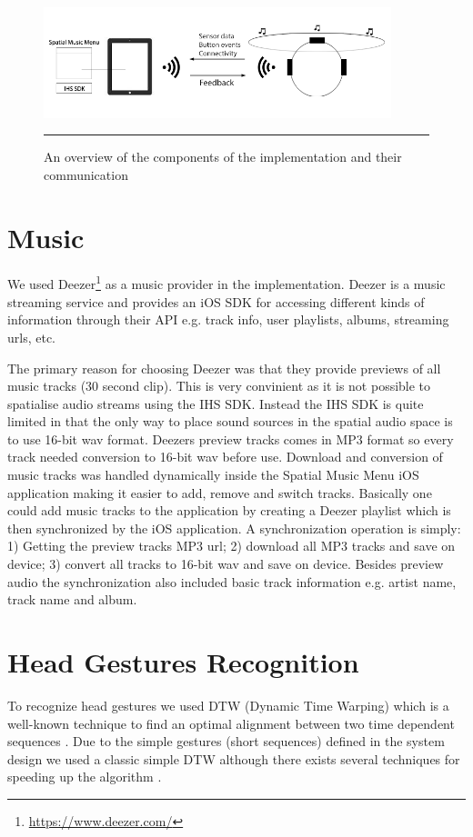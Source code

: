 \begin{figure}[t]
	\centering
		\includegraphics[width=0.9\textwidth,height=\textheight,keepaspectratio]{./Figures/implementation_overview.png}
		\rule{35em}{1pt}
	\caption[Implementation overview]{An overview of the components of the implementation and their communication}
	\label{fig:implementationoverview}
\end{figure}


\section{Music}
We used Deezer\footnote{\url{https://www.deezer.com/}} as a music provider in the implementation. Deezer is a music streaming service and provides an iOS SDK for accessing different kinds of information through their API e.g. track info, user playlists, albums, streaming urls, etc.

The primary reason for choosing Deezer was that they provide previews of all music tracks (30 second clip). This is very convinient as it is not possible to spatialise audio streams using the IHS SDK. Instead the IHS SDK is quite limited in that the only way to place sound sources in the spatial audio space is to use 16-bit wav format. Deezers preview tracks comes in MP3 format so every track needed conversion to 16-bit wav before use. Download and conversion of music tracks was handled dynamically inside the Spatial Music Menu iOS application making it easier to add, remove and switch tracks. Basically one could add music tracks to the application by creating a Deezer playlist which is then synchronized by the iOS application. A synchronization operation is simply: 1) Getting the preview tracks MP3 url; 2) download all MP3 tracks and save on device; 3) convert all tracks to 16-bit wav and save on device. Besides preview audio the synchronization also included basic track information e.g. artist name, track name and album.


\section{Head Gestures Recognition}
To recognize head gestures we used DTW (Dynamic Time Warping) which is a well-known technique to find an optimal alignment between two time dependent sequences \cite{muller_dynamic_2007}. Due to the simple gestures (short sequences) defined in the system design we used a classic simple DTW although there exists several techniques for speeding up the algorithm \cite{muller_dynamic_2007,salvador_toward_2007,akl_accelerometer-based_2010}. 

